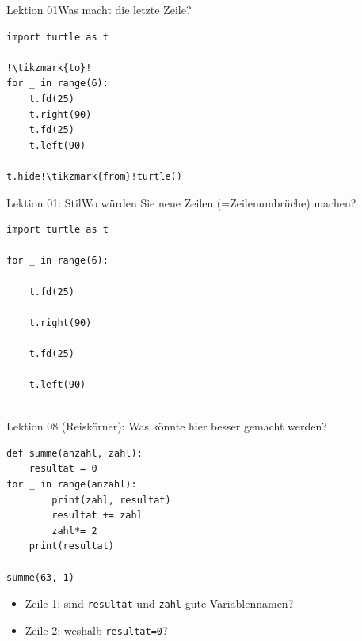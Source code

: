 \begin{frame}[fragile]{Lektion 01}{Was macht die letzte Zeile?}
\begin{lstlisting}
import turtle as t

!\tikzmark{to}!
for _ in range(6):
    t.fd(25)
    t.right(90)
    t.fd(25)
    t.left(90)
    
t.hide!\tikzmark{from}!turtle()
\end{lstlisting}


\end{frame}

\begin{frame}[fragile]{Lektion 01: Stil}{Wo würden Sie neue Zeilen (=Zeilenumbrüche) machen?}
\begin{lstlisting}
import turtle as t

for _ in range(6):

    t.fd(25)
    
    t.right(90)
    
    t.fd(25)
    
    t.left(90)
    
\end{lstlisting}

\end{frame}



\begin{frame}[fragile]{Lektion 08}
 (Reiskörner): Was könnte hier besser gemacht werden?
\begin{lstlisting}
def summe(anzahl, zahl):
    resultat = 0
for _ in range(anzahl):
        print(zahl, resultat)
        resultat += zahl
        zahl*= 2
    print(resultat)
    
summe(63, 1)
\end{lstlisting}
\begin{itemize}
    \item Zeile 1: sind \lstinline|resultat| und \lstinline|zahl| gute Variablennamen?
    \item Zeile 2: weshalb \lstinline|resultat=0|?
\end{itemize}
\end{frame}

